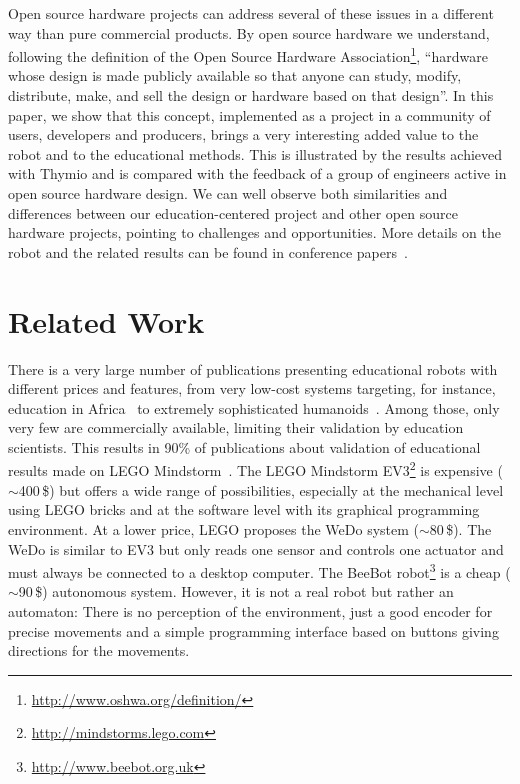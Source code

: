 \documentclass[letterpaper, 10 pt, conference]{ieeeconf}  %
\begin{document}
Open source hardware projects can address several of these issues in a different way than pure commercial products. 
By open source hardware we understand, following the definition of the Open Source Hardware Association\footnote{\url{http://www.oshwa.org/definition/}}, ``hardware whose design is made publicly available so that anyone can study, modify, distribute, make, and sell the design or hardware based on that design''.
In this paper, we show that this concept, implemented as a project in a community of users, developers and producers, brings a very interesting added value to the robot and to the educational methods. 
This is illustrated by the results achieved with Thymio and is compared with the feedback of a group of engineers active in open source hardware design.
We can well observe both similarities and differences between our education-centered project and other open source hardware projects, pointing to challenges and opportunities.
More details on the robot and the related results can be found in conference papers~\cite{festival2011,thymio2012arsi}.  

\section{Related Work}

There is a very large number of publications presenting educational robots with different prices and features, from very low-cost systems targeting, for instance, education in Africa~\cite{Rubenstein2015,Gyebi2015} to extremely sophisticated humanoids~\cite{Hood2015,Mazzoni2016}.
Among those, only very few are commercially available, limiting their validation by education scientists.
This results in 90\% of publications about validation of educational results made on LEGO Mindstorm~\cite{benitti2012exploring}.
The LEGO Mindstorm EV3\footnote{\url{http://mindstorms.lego.com}} is expensive ($\sim$400\,\$) but offers a wide range of possibilities, especially at the mechanical level using LEGO bricks and at the software level with its graphical programming environment. 
At a lower price, LEGO proposes the WeDo system ($\sim$80\,\$).
The WeDo is similar to EV3 but only reads one sensor and controls one actuator and must always be connected to a desktop computer.
The BeeBot robot\footnote{\url{http://www.beebot.org.uk}} is a cheap ($\sim$90\,\$) autonomous system.
However, it is not a real robot but rather an automaton: There is no perception of the environment, just a good encoder for precise movements and a simple programming interface based on buttons giving directions for the movements.
\end{document}
